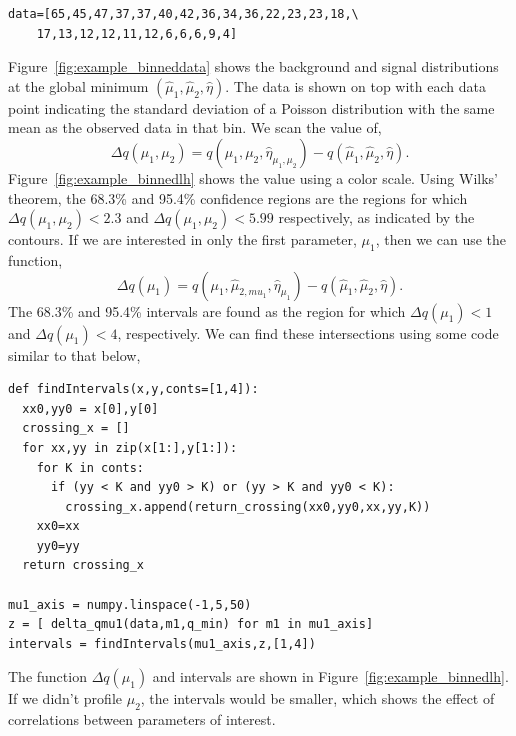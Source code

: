 \begin{tcolorbox}[colback=backblue]
\begin{lstlisting}[style = Python]
data=[65,45,47,37,37,40,42,36,34,36,22,23,23,18,\ 
    17,13,12,12,11,12,6,6,6,9,4]
\end{lstlisting}
Figure~\ref{fig:example_binneddata} shows the background and signal distributions at the global minimum $(\hat{\mu}_{1},\hat{\mu}_{2},\hat{\eta})$. The data is shown on top with each data point indicating the standard deviation of a Poisson distribution with the same mean as the observed data in that bin. We scan the value of, 
\begin{equation}
    \Delta q(\mu_1,\mu_2) =  q(\mu_1,\mu_2,\hat{\eta}_{\mu_1,\mu_2}) - q(\hat{\mu}_1,\hat{\mu}_2,\hat{\eta}).
\end{equation}
Figure~\ref{fig:example_binnedlh} shows the value using a color scale. Using Wilks' theorem, the 68.3\% and 95.4\% confidence regions are the regions for which $ \Delta q(\mu_1,\mu_2) < 2.3$ and  $ \Delta q(\mu_1,\mu_2) < 5.99$ respectively, as indicated by the contours. If we are interested in only the first parameter, $\mu_1$, then we can use the function,  
\begin{equation}
    \Delta q(\mu_1) =  q(\mu_1,\hat{\mu}_{2,mu_{1}},\hat{\eta}_{\mu_1}) - q(\hat{\mu}_1,\hat{\mu}_2,\hat{\eta}).
\end{equation} 
The 68.3\% and 95.4\% intervals are found as the region for which  $\Delta q(\mu_1)<1$ and $\Delta q(\mu_1)<4$, respectively. We can find these intersections using some code similar to that below, 
\begin{lstlisting}[style = Python]
def findIntervals(x,y,conts=[1,4]):
  xx0,yy0 = x[0],y[0]
  crossing_x = []
  for xx,yy in zip(x[1:],y[1:]):
    for K in conts:
      if (yy < K and yy0 > K) or (yy > K and yy0 < K):
        crossing_x.append(return_crossing(xx0,yy0,xx,yy,K))
    xx0=xx
    yy0=yy
  return crossing_x

mu1_axis = numpy.linspace(-1,5,50)
z = [ delta_qmu1(data,m1,q_min) for m1 in mu1_axis]
intervals = findIntervals(mu1_axis,z,[1,4])
\end{lstlisting}
The function $\Delta q(\mu_1)$ and intervals are shown in Figure~\ref{fig:example_binnedlh}. If we didn't profile $\mu_{2}$, the intervals would be smaller, which shows the effect of correlations between parameters of interest. 
\end{tcolorbox}
